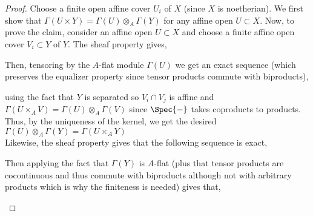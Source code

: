 \documentclass[12pt]{extarticle}
\theoremstyle{definition}
\begin{document}
\begin{proof}
Choose a finite open affine cover $U_i$ of $X$ (since $X$ is noetherian). We first show that $\Gamma(U \times Y) = \Gamma(U) \otimes_A \Gamma(Y)$ for any affine open $U \subset X$. Now, to prove the claim, consider an affine open $U \subset X$ and choose a finite affine open cover $V_i \subset Y$ of $Y$. The sheaf property gives, 
\begin{center}
\end{center}
Then, tensoring by the $A$-flat module $\Gamma(U)$ we get an exact sequence (which preserves the equalizer property since tensor products commute with biproducts), 
\begin{center}
\end{center}
using the fact that $Y$ is separated so $V_i \cap V_j$ is affine and $\Gamma(U \times_A V) = \Gamma(U) \otimes_A \Gamma(V)$ since $\Spec{-}$ takes coproducts to products. Thus, by the uniqueness of the kernel, we get the desired $\Gamma(U) \otimes_A \Gamma(Y) = \Gamma(U \times_A Y)$
\bigskip\\
Likewise, the sheaf property gives that the following sequence is exact,
\begin{center}
\end{center}
Then applying the fact that $\Gamma(Y)$ is $A$-flat (plus that tensor products are cocontinuous and thus commute with biproducts although not with arbitrary products which is why the finiteness is needed) gives that,
\begin{center}

\end{center}
\end{proof}
\end{document}
